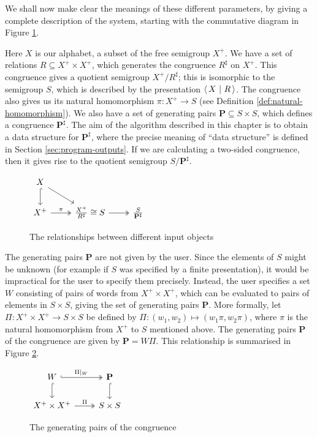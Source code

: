 We shall now make clear the meanings of these different parameters, by giving a
complete description of the system, starting with the commutative diagram in
Figure \ref{fig:pairs-cd-1}.

Here $X$ is our alphabet, a subset of the free semigroup $X^+$.  We have a set
of relations $R \subseteq X^+ \times X^+$, which generates the congruence
$R^\sharp$ on $X^+$.  This congruence gives a quotient semigroup
$X^+ / R^\sharp$; this is isomorphic to the semigroup $S$,
which is described by the presentation $\left\langle\,X ~\middle|~ R\,\right\rangle$.  The
congruence also gives us its natural homomorphism $\pi: X^+ \to S$ (see
Definition \ref{def:natural-homomorphism}).  We also have a set of generating pairs
$\mathbf{P} \subseteq S \times S$, which defines a congruence
$\mathbf{P}^\sharp$.  The aim of the algorithm described in this chapter is to
obtain a data structure for $\mathbf{P}^\sharp$, where the precise meaning of
``data structure'' is defined in Section \ref{sec:program-outputs}.  If we are
calculating a two-sided congruence, then it gives rise to the
quotient semigroup $S / \mathbf{P}^\sharp$.

\begin{figure}[h]
  \centering
  $\begin{tikzcd}
    X \arrow[dr] \arrow[d, hook] & \\
    X^+ \arrow[r, two heads, "\pi"] & \frac{X^+}{R^\sharp} \cong S \arrow[r, two heads] & \frac{S}{\mathbf{P}^\sharp}
  \end{tikzcd}$
  \caption{The relationships between different input objects}
  \label{fig:pairs-cd-1}
\end{figure}

The generating pairs $\mathbf{P}$ are not given by the user.  Since the elements
of $S$ might be unknown (for example if $S$ was specified by a finite
presentation), it would be impractical for the user to specify them precisely.
Instead, the user specifies a set $W$ consisting of pairs of words from
$X^+ \times X^+$, which can be evaluated to pairs of elements in $S \times S$,
giving the set of generating pairs $\mathbf{P}$.
More formally, let
$\Pi: X^+ \times X^+ \to S \times S$ be defined by
$\Pi: (w_1, w_2) \mapsto (w_1\pi, w_2\pi)$, where $\pi$ is the natural
homomorphism from $X^+$ to $S$ mentioned above.  The generating pairs
$\mathbf{P}$ of the congruence are given by $\mathbf{P} = W \Pi$.
This relationship is summarised in Figure \ref{fig:pairs-cd-2}.

\begin{figure}[h]
  \centering
  $\begin{tikzcd}
    W \arrow[r, hook, two heads, "\Pi|_W"] \arrow[d, hook] & \mathbf{P} \arrow[d, hook] \\
    X^+ \times X^+ \arrow[r, two heads, "\Pi"] & S \times S
  \end{tikzcd}$
  \caption{The generating pairs of the congruence}
  \label{fig:pairs-cd-2}
\end{figure}

